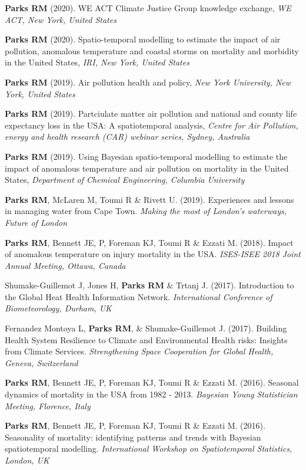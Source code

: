 \noindent \textbf{Parks RM} (2020). WE ACT Climate Justice Group knowledge exchange, \textit{WE ACT, New York, United States} \bigskip

\noindent \textbf{Parks RM} (2020). Spatio-temporal modelling to estimate the impact of air pollution, anomalous temperature and coastal storms on mortality and morbidity in the United States,  \textit{IRI, New York, United States} \bigskip

\noindent \textbf{Parks RM} (2019). Air pollution health and policy,  \textit{New York University, New York, United States} \bigskip

\noindent \textbf{Parks RM} (2019). Partciulate matter air pollution and national and county life expectancy loss in the USA: A spatiotemporal analysis,  \textit{Centre for Air Pollution, energy and health research (CAR) webinar series, Sydney, Australia} \bigskip

\noindent \textbf{Parks RM} (2019). Using Bayesian spatio-temporal modelling to estimate the impact of anomalous temperature and air pollution on mortality in the United States,  \textit{Department of Chemical Engineering, Columbia University} \bigskip

\noindent \textbf{Parks RM}, McLaren M, Toumi R \& Rivett U. (2019). Experiences and lessons in managing water from Cape Town. \textit{Making the most of London's waterways, Future of London} \bigskip

\noindent \textbf{Parks RM}, Bennett JE, P, Foreman KJ, Toumi R \& Ezzati M. (2018). Impact of anomalous temperature on injury mortality in the USA.  \textit{ISES-ISEE 2018 Joint Annual Meeting, Ottawa, Canada} \bigskip

\noindent Shumake-Guillemot J, Jones H, \textbf{Parks RM} \& Trtanj J. (2017). Introduction to the Global Heat Health Information Network.  \textit{International Conference of Biometeorology, Durham, UK} \bigskip

\noindent Fernandez Montoya L, \textbf{Parks RM}, \& Shumake-Guillemot J. (2017). Building Health System Resilience to Climate and Environmental Health risks: Insights from Climate Services.  \textit{Strengthening Space Cooperation for Global Health, Geneva, Switzerland} \bigskip

\noindent \textbf{Parks RM}, Bennett JE, P, Foreman KJ, Toumi R \& Ezzati M. (2016). Seasonal dynamics of mortality in the USA from 1982 - 2013. \textit{Bayesian Young Statistician Meeting, Florence, Italy} \bigskip

\noindent \textbf{Parks RM}, Bennett JE, P, Foreman KJ, Toumi R \& Ezzati M. (2016). Seasonality of mortality: identifying patterns and trends with Bayesian spatiotemporal modelling. \textit{International Workshop on Spatiotemporal Statistics, London, UK}

